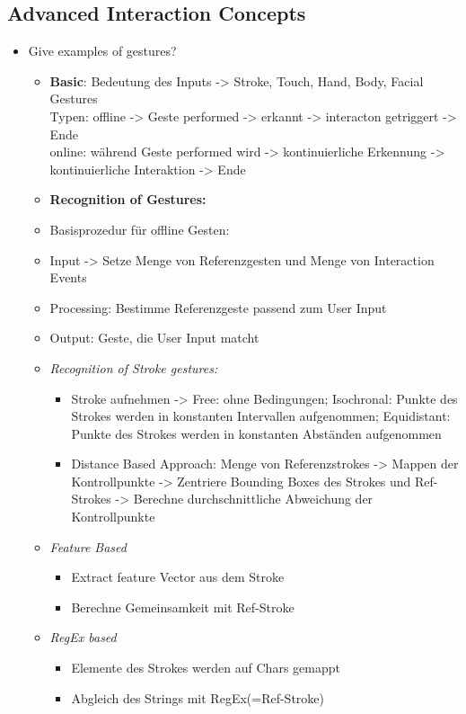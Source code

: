 \subsection{Advanced Interaction Concepts}
\begin{itemize}
	\item Give examples of gestures?
	\begin{itemize}
		\item \textbf{Basic}: Bedeutung des Inputs -> Stroke, Touch, Hand, Body, Facial Gestures\\
		Typen: offline -> Geste performed -> erkannt -> interacton getriggert -> Ende\\
		online: während Geste performed wird -> kontinuierliche Erkennung -> kontinuierliche Interaktion -> Ende
		\item \textbf{Recognition of Gestures:} 
		\item Basisprozedur für offline Gesten: 
		\item Input -> Setze Menge von Referenzgesten und Menge von Interaction Events
		\item Processing: Bestimme Referenzgeste passend zum User Input
		\item Output: Geste, die User Input matcht
		\item \textit{Recognition of Stroke gestures:}
		\begin{itemize}
			\item Stroke aufnehmen -> Free: ohne Bedingungen; Isochronal: Punkte des Strokes werden in konstanten Intervallen aufgenommen; Equidistant: Punkte des Strokes werden in konstanten Abständen aufgenommen
			\item Distance Based Approach: Menge von Referenzstrokes -> Mappen der Kontrollpunkte -> Zentriere Bounding Boxes des Strokes und Ref-Strokes -> Berechne durchschnittliche Abweichung der Kontrollpunkte
		\end{itemize}
		\item \textit{Feature Based}
		\begin{itemize}
			\item Extract feature Vector aus dem Stroke
			\item Berechne Gemeinsamkeit mit Ref-Stroke
		\end{itemize}
		\item \textit{RegEx based}
		\begin{itemize}
			\item Elemente des Strokes werden auf Chars gemappt
			\item Abgleich des Strings mit RegEx(=Ref-Stroke)
		\end{itemize}
	\end{itemize}
	

\end{itemize}
